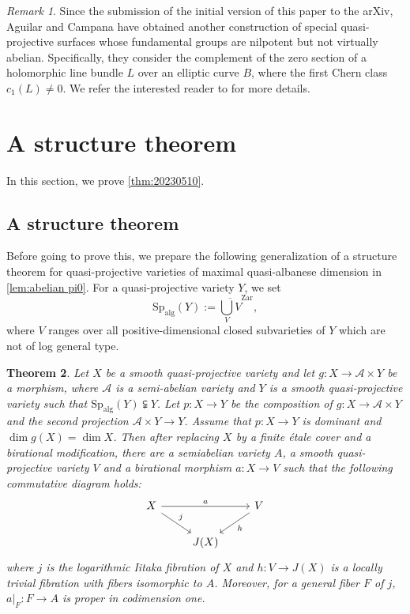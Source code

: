 \documentclass[11pt,english]{smfart}
\theoremstyle{plain}
\newtheorem{thm}{Theorem}[section]
\theoremstyle{definition}
\theoremstyle{remark}
\newtheorem{rem}[thm]{Remark}
\numberwithin{equation}{subsection}
\theoremstyle{plain}
\newcommand{\cA}{\mathcal A}
\newcommand{\Spalg}{\mathrm{Sp}_{\mathrm{alg}}}
\begin{document}
\begin{rem}
Since the submission of the initial version of this paper to the arXiv, Aguilar and Campana have  obtained another construction of special quasi-projective surfaces whose  fundamental groups are nilpotent but not virtually abelian.  Specifically, they consider the complement of the zero section of a holomorphic line bundle $L$ over an elliptic curve $B$, where the first Chern class $c_1(L) \neq 0$. We refer the interested reader   to \cite[Example 24]{AC25} for more details. 
\end{rem}
\section[A structure theorem]{A structure theorem}      
In this section, we prove \cref{thm:20230510}.  
\subsection{A structure theorem}
Before going to prove this, we prepare the following generalization of a structure theorem for quasi-projective varieties of maximal quasi-albanese dimension in \cref{lem:abelian pi0}. 
For a quasi-projective variety $Y$, we set
$$\Spalg(Y) := \overline{\bigcup_{V} V}^{\mathrm{Zar}},$$
where $V$ ranges over all positive-dimensional closed subvarieties of $Y$ which are not of log general type. 




\begin{thm}\label{thm:202305101} 
Let $X$ be a smooth quasi-projective variety and let $g:X\to \cA\times Y$ be a morphism, where $\cA$ is a semi-abelian variety and $Y$ is a smooth quasi-projective variety such that $\Spalg(Y)\subsetneqq Y$.
Let $p:X\to Y$ be the composition of $g:X\to \cA\times Y$ and the second projection $\cA\times Y\to Y$.
Assume that $p:X\to Y$ is dominant and $\dim g(X)=\dim X$.
Then after replacing $X$ by a finite \'etale cover and a birational modification, there are a semiabelian variety $A$, a smooth quasi-projective variety $V$  and a birational morphism $a:X\to V$  such that the following commutative diagram holds:
		\begin{equation*} 
			\begin{tikzcd}
				X \arrow[rr,    "a"] \arrow[dr, "j"] & & V \arrow[ld, "h"]\\
				& J(X)&
			\end{tikzcd}
		\end{equation*}
		where $j$ is the logarithmic Iitaka fibration of $X$ and $h:V\to J(X)$ is a  locally trivial fibration with fibers isomorphic to $A$.  
Moreover, for a   general fiber $F$ of $j$, $a|_{F}:F\to A$ is proper in codimension one.  
\end{thm}
\end{document}
